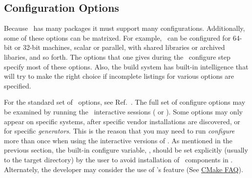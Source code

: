 \subsection{Configuration Options}
\label{sec:configuration_options}

Because \draco\ has many packages it must support many configurations.
Additionally, some of these options can be matrixed.  For example,
\draco\ can be configured for 64-bit or 32-bit machines, scalar or parallel, with shared libraries or
archived libaries, and so forth.  The options that one gives during the \cmake\ 
configure step specify most of these options. Also, the build
system has built-in intelligence that will try to make the right
choice if incomplete listings for various options are specified.

For the standard set of \cmake\ options, see Ref.~\cite{cmake}.  The full set of configure options may be examined by running the \cmake\ interactive sessions ( or ).  Some options may only appear on specific systems, after specific vendor installations are discovered, or for specific {\it generators}.  This is the reason that you may need to run {\it configure} more than once when using the interactive versions of \cmake.
As mentioned in the previous section, the built-in configure variable, , should be set explicitly (usually to the target directory) by the
user to avoid installation of \draco\ components in \comp{/usr/local/}.  Alternately, the developer may consider the use of \cmake's \comp{DESTDIR} feature (See \href{http://www.cmake.org/Wiki/CMake_FAQ#Does_CMake.27s_.22make_install.22_support_DESTDIR.3F}{CMake FAQ}).

